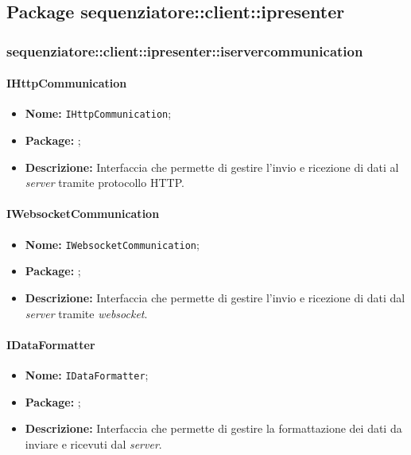 \subsection{Package sequenziatore::client::ipresenter}



\subsubsection{sequenziatore::client::ipresenter::iservercommunication}

\paragraph{IHttpCommunication}
\begin{itemize}
\item \textbf{Nome:} \texttt{IHttpCommunication};
\item \textbf{Package:} \texttt{\serverCommunication{}};
\item \textbf{Descrizione:} Interfaccia che permette di gestire l'invio e ricezione di dati al \textit{server} tramite protocollo HTTP.
\end{itemize}

\paragraph{IWebsocketCommunication}
\begin{itemize}
\item \textbf{Nome:} \texttt{IWebsocketCommunication};
\item \textbf{Package:} \texttt{\serverCommunication{}};
\item \textbf{Descrizione:} Interfaccia che permette di gestire l'invio e ricezione di dati dal \textit{server} tramite \textit{websocket}.
\end{itemize}

\paragraph{IDataFormatter}
\begin{itemize}
\item \textbf{Nome:} \texttt{IDataFormatter};
\item \textbf{Package:} \texttt{\serverCommunication{}};
\item \textbf{Descrizione:} Interfaccia che permette di gestire la formattazione dei dati da inviare e ricevuti dal \textit{server}.
\end{itemize}


